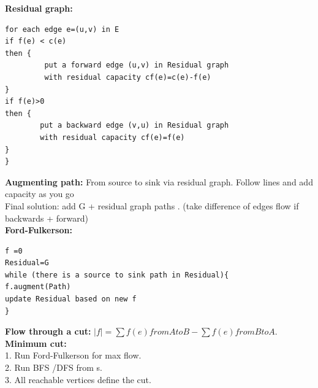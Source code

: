 \documentclass[paper=a4, fontsize=11pt]{scrartcl} %
\begin{document}
\textbf{Residual graph:}
\begin{lstlisting}[frame=single]
for each edge e=(u,v) in E
if f(e) < c(e)	
then {	
	 	 put a forward edge (u,v) in Residual graph
	 	 with residual capacity cf(e)=c(e)-f(e)	
}	
if f(e)>0	
then {	
	 	put a backward edge (v,u) in Residual graph
	 	with residual capacity cf(e)=f(e)	
}	
}	
\end{lstlisting}
\textbf{Augmenting path: }From source to sink via residual graph. Follow lines and add capacity as you go\\
Final solution: add G + residual graph paths . (take difference of edges flow if backwards + forward)\\
\textbf{Ford-Fulkerson:}\\
\begin{lstlisting}[frame=single]
f =0
Residual=G
while (there is a source to sink path in Residual){
f.augment(Path)
update Residual based on new f
}
\end{lstlisting}
\textbf{Flow through a cut: } $|f|=\sum f(e) from A to B - \sum f(e) from B to A$.\\
\textbf{Minimum cut: } \\
1. Run Ford-Fulkerson for max flow.\\
2. Run BFS /DFS from s.\\
3. All reachable vertices define the cut.
\end{document}
